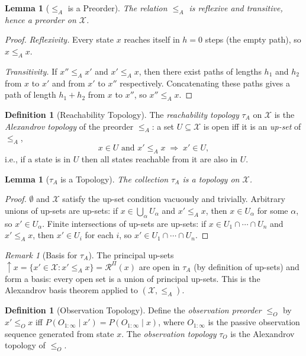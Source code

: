 \documentclass[11pt, a4paper]{article}
\theoremstyle{plain}
\newtheorem{lemma}[theorem]{Lemma}
\theoremstyle{definition}
\newtheorem{definition}[theorem]{Definition}
\theoremstyle{remark}
\newtheorem{remark}[theorem]{Remark}
\newcommand{\calX}{\mathcal{X}}
\newcommand{\calR}{\mathcal{R}}
\begin{document}
\begin{lemma}[$\leq_A$ is a Preorder]
\label{lem:preorder}
The relation $\leq_A$ is reflexive and transitive, hence a preorder on $\calX$.
\end{lemma}

\begin{proof}
\emph{Reflexivity.} Every state $x$ reaches itself in $h = 0$ steps (the
empty path), so $x \leq_A x$.

\emph{Transitivity.} If $x'' \leq_A x'$ and $x' \leq_A x$, then there exist
paths of lengths $h_1$ and $h_2$ from $x$ to $x'$ and from $x'$ to $x''$
respectively. Concatenating these paths gives a path of length $h_1 + h_2$
from $x$ to $x''$, so $x'' \leq_A x$.
\end{proof}

\begin{definition}[Reachability Topology]
\label{def:reach_top}
The \emph{reachability topology} $\tau_A$ on $\calX$ is the
\emph{Alexandrov topology} of the preorder $\leq_A$: a set
$U \subseteq \calX$ is open iff it is an \emph{up-set} of $\leq_A$,
\[
  x \in U \text{ and } x' \leq_A x \;\Longrightarrow\; x' \in U,
\]
i.e., if a state is in $U$ then all states reachable from it are also in $U$.
\end{definition}

\begin{lemma}[$\tau_A$ is a Topology]
\label{lem:topology}
The collection $\tau_A$ is a topology on $\calX$.
\end{lemma}

\begin{proof}
$\emptyset$ and $\calX$ satisfy the up-set condition vacuously and trivially.
Arbitrary unions of up-sets are up-sets: if $x \in \bigcup_\alpha U_\alpha$
and $x' \leq_A x$, then $x \in U_\alpha$ for some $\alpha$, so $x' \in
U_\alpha$. Finite intersections of up-sets are up-sets: if $x \in U_1 \cap
\cdots \cap U_n$ and $x' \leq_A x$, then $x' \in U_i$ for each $i$, so
$x' \in U_1 \cap \cdots \cap U_n$.
\end{proof}

\begin{remark}[Basis for $\tau_A$]
The principal up-sets ${\uparrow}x = \{x' \in \calX : x' \leq_A x\} =
\calR^\Pi(x)$ are open in $\tau_A$ (by definition of up-sets) and form a
basis: every open set is a union of principal up-sets. This is the Alexandrov
basis theorem applied to $(\calX, \leq_A)$.
\end{remark}

\begin{definition}[Observation Topology]
\label{def:obs_top}
Define the \emph{observation preorder} $\leq_O$ by $x' \leq_O x$ iff
$P(O_{1:\infty} \mid x') = P(O_{1:\infty} \mid x)$, where $O_{1:\infty}$ is
the passive observation sequence generated from state $x$. The
\emph{observation topology} $\tau_O$ is the Alexandrov topology of $\leq_O$.
\end{definition}
\end{document}
